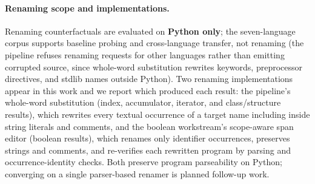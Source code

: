 \paragraph{Renaming scope and implementations.}
Renaming counterfactuals are evaluated on \textbf{Python only}; the
seven-language corpus supports baseline probing and cross-language
transfer, not renaming (the pipeline refuses renaming requests for other
languages rather than emitting corrupted source, since whole-word
substitution rewrites keywords, preprocessor directives, and stdlib names
outside Python). Two renaming implementations appear in this work and we
report which produced each result: the pipeline's whole-word substitution
(index, accumulator, iterator, and class/structure results), which
rewrites every textual occurrence of a target name including inside
string literals and comments, and the boolean workstream's scope-aware
span editor (boolean results), which renames only identifier occurrences,
preserves strings and comments, and re-verifies each rewritten program by
parsing and occurrence-identity checks. Both preserve program parseability
on Python; converging on a single parser-based renamer is planned
follow-up work.
